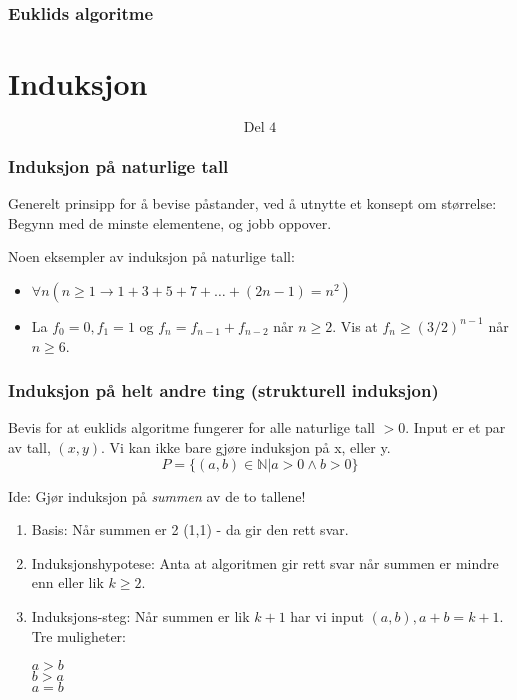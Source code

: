 \documentclass{beamer}
\begin{document}
\begin{frame}
	\frametitle{Euklids algoritme}
\end{frame}

\section{Induksjon}

\begin{frame}
\[\text{Del 4}\]
\end{frame}

\begin{frame}
\frametitle{Induksjon på naturlige tall}
Generelt prinsipp for å bevise påstander, ved å utnytte et konsept om størrelse: Begynn med de minste elementene, og jobb oppover. \linebreak

Noen eksempler av induksjon på naturlige tall:
\begin{itemize}
	\item $\forall n (n \geq 1 \rightarrow 1 + 3 + 5 + 7 +\dots + (2n-1) = n^2)$
	\item La $f_0 = 0, f_1 = 1$ og $f_n = f_{n-1} + f_{n-2}$ når $n \geq 2$. Vis at $f_n \geq (3/2)^{n-1}$ når $n \geq 6$.
\end{itemize}

\end{frame}

\begin{frame}
\frametitle{Induksjon på helt andre ting (strukturell induksjon)}
Bevis for at euklids algoritme fungerer for alle naturlige tall $>0$. Input er et par av tall, $(x,y)$. Vi kan ikke bare gjøre induksjon på x, eller y. 
\[P = \{(a,b) \in \mathbb{N}| a > 0 \wedge b > 0\}\]

Ide: Gjør induksjon på \textit{summen} av de to tallene!

\begin{enumerate} 
	\item Basis: Når summen er 2 (1,1) - da gir den rett svar.
	\item Induksjonshypotese: Anta at algoritmen gir rett svar når summen er mindre enn eller lik $k \geq 2$.
	\item Induksjons-steg: Når summen er lik $k+1$ har vi input $(a,b), a + b = k + 1$. Tre muligheter: \linebreak
	
	$a > b$ \\
	$b > a$ \\
	$a = b$
\end{enumerate}
\end{frame}
\end{document}

